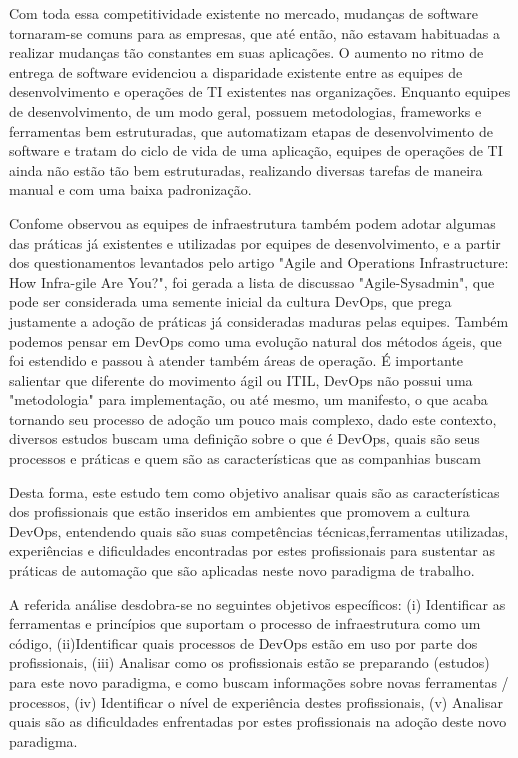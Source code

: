 \documentclass[twoside,english,brazilian]{UNISINOSartigo}
\begin{document}
Com toda essa competitividade existente no mercado, mudanças de software tornaram-se comuns para as empresas, que até então, não estavam habituadas a realizar mudanças tão constantes em suas aplicações. O aumento no ritmo de entrega de software evidenciou a disparidade existente entre as equipes de desenvolvimento e operações de TI existentes nas organizações. Enquanto equipes de desenvolvimento, de um modo geral, possuem metodologias, frameworks e ferramentas bem estruturadas, que automatizam etapas de desenvolvimento de software e tratam do ciclo de vida de uma aplicação, equipes de operações de TI ainda  não estão tão bem estruturadas, realizando diversas tarefas de maneira manual e com uma baixa padronização. 

Confome  observou as equipes de infraestrutura também podem adotar algumas das práticas já existentes e utilizadas por equipes de desenvolvimento, e a partir dos questionamentos levantados pelo artigo "Agile and Operations Infrastructure: How Infra-gile Are You?", foi gerada a lista de discussao "Agile-Sysadmin", que pode ser considerada uma semente inicial da cultura DevOps, que prega justamente a adoção de práticas já consideradas maduras pelas equipes. Também podemos pensar em DevOps como uma evolução natural dos métodos ágeis, que foi estendido e passou à atender também áreas de operação. É importante salientar que diferente do movimento ágil ou ITIL, DevOps não possui uma "metodologia" para implementação, ou até mesmo, um manifesto, o que acaba tornando seu processo de adoção um pouco mais complexo, dado este contexto, diversos estudos buscam uma definição sobre o que é DevOps, quais são seus processos e práticas e quem são as características que as companhias buscam 

Desta forma, este estudo tem como objetivo analisar quais são as características dos profissionais que estão inseridos em ambientes que promovem a cultura DevOps, entendendo quais são suas competências técnicas,ferramentas utilizadas, experiências e dificuldades encontradas por estes profissionais para sustentar as práticas de automação que são aplicadas neste novo paradigma de trabalho.

A referida análise desdobra-se no seguintes objetivos específicos: (i) Identificar as ferramentas e princípios que suportam o processo de infraestrutura como um código, (ii)Identificar quais processos de DevOps estão em uso por parte dos profissionais, (iii) Analisar como os profissionais estão se preparando (estudos) para este novo paradigma, e como buscam informações sobre novas ferramentas / processos, (iv) Identificar o nível de experiência destes profissionais, (v) Analisar quais são as dificuldades enfrentadas por estes profissionais na adoção deste novo paradigma.
\end{document}
